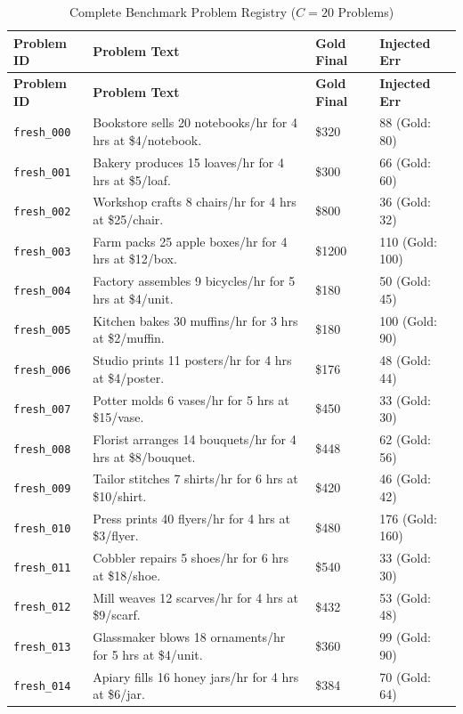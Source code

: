 \documentclass[11pt,letterpaper]{article}
\begin{document}
\begin{longtable}{p{2.5cm}p{7.5cm}p{2.0cm}p{2.0cm}}
\caption{Complete Benchmark Problem Registry ($C=20$ Problems)} \label{tab:app_problems} \\
\toprule
\textbf{Problem ID} & \textbf{Problem Text} & \textbf{Gold Final} & \textbf{Injected Err} \\
\midrule
\endfirsthead
\toprule
\textbf{Problem ID} & \textbf{Problem Text} & \textbf{Gold Final} & \textbf{Injected Err} \\
\midrule
\endhead
\bottomrule
\endfoot
\texttt{fresh\_000} & Bookstore sells 20 notebooks/hr for 4 hrs at \$4/notebook. & \$320 & 88 (Gold: 80) \\
\texttt{fresh\_001} & Bakery produces 15 loaves/hr for 4 hrs at \$5/loaf. & \$300 & 66 (Gold: 60) \\
\texttt{fresh\_002} & Workshop crafts 8 chairs/hr for 4 hrs at \$25/chair. & \$800 & 36 (Gold: 32) \\
\texttt{fresh\_003} & Farm packs 25 apple boxes/hr for 4 hrs at \$12/box. & \$1200 & 110 (Gold: 100) \\
\texttt{fresh\_004} & Factory assembles 9 bicycles/hr for 5 hrs at \$4/unit. & \$180 & 50 (Gold: 45) \\
\texttt{fresh\_005} & Kitchen bakes 30 muffins/hr for 3 hrs at \$2/muffin. & \$180 & 100 (Gold: 90) \\
\texttt{fresh\_006} & Studio prints 11 posters/hr for 4 hrs at \$4/poster. & \$176 & 48 (Gold: 44) \\
\texttt{fresh\_007} & Potter molds 6 vases/hr for 5 hrs at \$15/vase. & \$450 & 33 (Gold: 30) \\
\texttt{fresh\_008} & Florist arranges 14 bouquets/hr for 4 hrs at \$8/bouquet. & \$448 & 62 (Gold: 56) \\
\texttt{fresh\_009} & Tailor stitches 7 shirts/hr for 6 hrs at \$10/shirt. & \$420 & 46 (Gold: 42) \\
\texttt{fresh\_010} & Press prints 40 flyers/hr for 4 hrs at \$3/flyer. & \$480 & 176 (Gold: 160) \\
\texttt{fresh\_011} & Cobbler repairs 5 shoes/hr for 6 hrs at \$18/shoe. & \$540 & 33 (Gold: 30) \\
\texttt{fresh\_012} & Mill weaves 12 scarves/hr for 4 hrs at \$9/scarf. & \$432 & 53 (Gold: 48) \\
\texttt{fresh\_013} & Glassmaker blows 18 ornaments/hr for 5 hrs at \$4/unit. & \$360 & 99 (Gold: 90) \\
\texttt{fresh\_014} & Apiary fills 16 honey jars/hr for 4 hrs at \$6/jar. & \$384 & 70 (Gold: 64) \\

\end{longtable}
\end{document}
